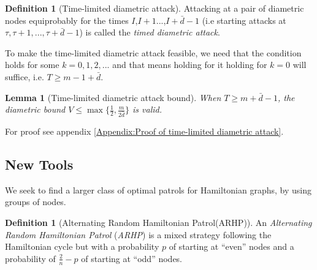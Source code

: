\documentclass[a4paper,10pt]{article}
\newtheorem{lemma}[theorem]{Lemma}
\theoremstyle{definition}
\newtheorem{definition}[theorem]{Definition}
\theoremstyle{definition}
\theoremstyle{remark}
\theoremstyle{definition}
\begin{document}
\begin{definition}[Time-limited diametric attack]
Attacking at a pair of diametric nodes equiprobably for the times $I$,$I+1$...,$I+\bar{d}-1$ (i.e starting attacks at $\tau,\tau+1,...,\tau+\bar{d}-1$) is called the \textit{timed diametric attack}.
\end{definition}

To make the time-limited diametric attack feasible, we need that the condition holds for some $k=0,1,2,...$ and that means holding for it holding for $k=0$ will suffice, i.e. $T \geq m-1+\bar{d}$.

\begin{lemma}[Time-limited diametric attack bound]
When $T \geq m+ \bar{d}-1$, the diametric bound $V \leq \max\{\frac{1}{2},\frac{m}{2\bar{d}}\}$ is valid.
\end{lemma}

For proof see appendix \ref{Appendix:Proof of time-limited diametric attack}.

\subsection{New Tools}
We seek to find a larger class of optimal patrols for Hamiltonian graphs, by using groups of nodes.

\begin{definition}[Alternating Random Hamiltonian Patrol(ARHP)]
An \textit{Alternating Random Hamiltonian Patrol} (\textit{ARHP}) is a mixed strategy following the Hamiltonian cycle but with a probability $p$ of starting at ``even'' nodes and a probability of $\frac{2}{n}-p$ of starting at ``odd'' nodes.
\end{definition}
\end{document}
